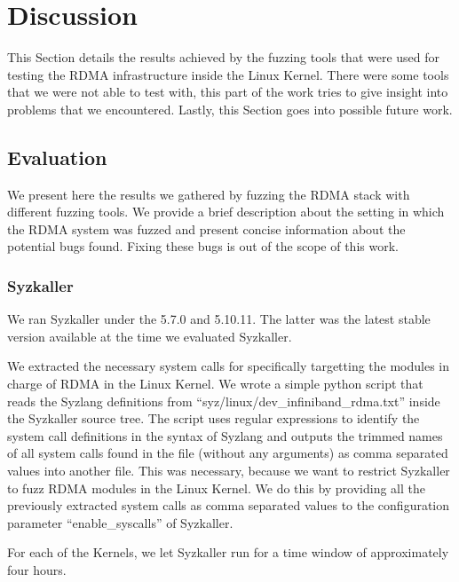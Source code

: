 \section{Discussion}

This Section details the results achieved by the fuzzing tools
that were used for testing the RDMA infrastructure inside the Linux Kernel.
There were some tools that we were not able to test with,
this part of the work tries to give insight into problems that we encountered.
Lastly, this Section goes into possible future work.


\subsection{Evaluation}\label{s:evaluation}

We present here the results we gathered
by fuzzing the RDMA stack with different fuzzing tools. We provide
a brief description about the setting in which the RDMA system was fuzzed
and present concise information about the potential bugs found. Fixing these
bugs is out of the scope of this work.

\subsubsection{Syzkaller}

We ran Syzkaller under the  5.7.0 and 5.10.11. The latter was
the latest stable version available at the time we evaluated Syzkaller.

We extracted the necessary system calls for specifically targetting the modules
in charge of RDMA in the Linux Kernel. We wrote a simple python script
that reads the Syzlang definitions from ``syz/linux/dev\_infiniband\_rdma.txt'' inside the
Syzkaller source tree. The script uses regular expressions to identify the system call definitions
in the syntax of Syzlang and outputs the trimmed names of all system calls found in the file (without any arguments)
as comma separated values into another file. This was necessary, because we want to restrict Syzkaller
to fuzz RDMA modules in the Linux Kernel. We do this by providing all the previously extracted system calls
as comma separated values to the configuration parameter ``enable\_syscalls'' of Syzkaller.

For each of the Kernels, we let Syzkaller run for a time window of approximately four hours.

